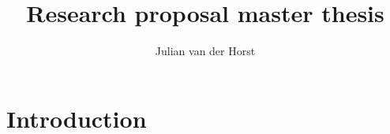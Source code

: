 \documentclass[11pt,a4paper]{article}
\title{Research proposal master thesis}
\author{Julian van der Horst}
\begin{document}
 
\maketitle
\section{Introduction}
\end{document}
